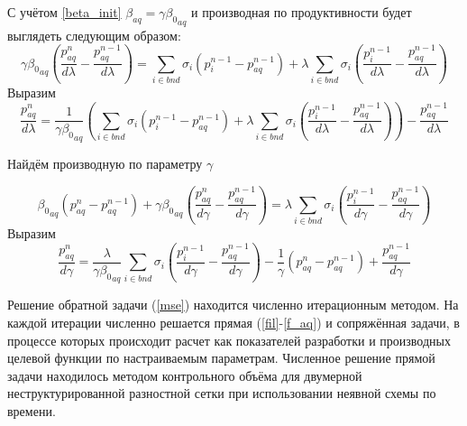 \documentclass[14pt]{article}
\begin{document}
С учётом \ref{beta_init} $ \beta_{aq} = \gamma{\beta_0}_{aq} $ и производная по продуктивности будет выглядеть следующим образом:
\begin{equation} \label{eq_aq_dlambda}
\gamma{\beta_0}_{aq}\left(\frac{p_{aq}^n}{d\lambda}  -\frac{p_{aq}^{n-1}}{d\lambda}\right) =\sum_{i \in bnd}\sigma_i(p^{n-1}_i-p_{aq}^{n-1}) +  \lambda\sum_{i \in bnd}\sigma_i(\frac{p^{n-1}_i}{d\lambda}-\frac{p_{aq}^{n-1}}{d\lambda})
\end{equation}
Выразим
\begin{equation} \label{eq_aq_dlambda}
\frac{p_{aq}^n}{d\lambda} =\frac{1}{\gamma{\beta_0}_{aq}}\left(\sum_{i \in bnd}\sigma_i(p^{n-1}_i-p_{aq}^{n-1}) +  \lambda\sum_{i \in bnd}\sigma_i(\frac{p^{n-1}_i}{d\lambda}-\frac{p_{aq}^{n-1}}{d\lambda})\right) -\frac{p_{aq}^{n-1}}{d\lambda}
\end{equation}

Найдём производную по параметру $ \gamma $ 



\begin{equation} \label{eq_aq_dgamma}
{\beta_0}_{aq}(p_{aq}^n - p_{aq}^{n-1}) + \gamma{\beta_0}_{aq} \left(\frac{p_{aq}^n}{d\gamma}  -\frac{p_{aq}^{n-1}}{d\gamma}\right) = \lambda\sum_{i \in bnd}\sigma_i(\frac{p^{n-1}_i}{d\gamma}-\frac{p_{aq}^{n-1}}{d\gamma})
\end{equation}
Выразим
\begin{equation} \label{eq_dpaq_dgamm}
\frac{p_{aq}^n}{d\gamma}   = \frac{\lambda}{\gamma{\beta_0}_{aq} }\sum_{i \in bnd}\sigma_i\left(\frac{p^{n-1}_i}{d\gamma}-\frac{p_{aq}^{n-1}}{d\gamma}\right) - \frac{1}{\gamma}\left(p_{aq}^n - p_{aq}^{n-1}\right) + \frac{p_{aq}^{n-1}}{d\gamma}
\end{equation}

Решение обратной задачи (\ref{mse}) находится численно итерационным методом. На каждой итерации численно решается прямая (\ref{fil}-\ref{f_aq}) и сопряжённая задачи, в процессе которых происходит расчет как показателей разработки и производных целевой функции по настраиваемым параметрам. Численное решение прямой задачи находилось методом контрольного объёма  для двумерной неструктурированной разностной сетки при использовании неявной схемы по времени.
\end{document}
